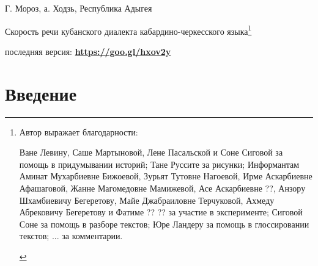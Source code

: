 
\usepackage{alltt}

\begin{flushright}
	{\footnotesize Г. Мороз, а. Ходзь, Республика Адыгея}
\end{flushright}
\begin{center}{\Large Скорость речи кубанского диалекта кабардино-черкесского языка\footnote{Автор выражает благодарности:
\begin{itemize}
\mytem Ване Левину, Саше Мартыновой, Лене Пасальской и Соне Сиговой за помощь в придумывании историй;
\mytem Тане Руссите за рисунки;
\mytem Информантам Аминат Мухарбиевне Бижоевой, Зурьят Тутовне Нагоевой, Ирме Аскарбиевне Афашаговой, Жанне Магомедовне Мамижевой, Асе Аскарбиевне ??, Анзору Шхамбиевичу Бегеретову, Майе Джабраиловне Терчуковой,  Ахмеду Абрековичу Бегеретову и Фатиме ?? ?? за участие в эксперименте;
\mytem Сиговой Соне за помощь в разборе текстов;
\mytem Юре Ландеру за помощь в глоссировании текстов;
\mytem ... за комментарии.
\end{itemize}}}
\end{center}
{\noindent\footnotesize последняя версия: \textbf{\href{https://goo.gl/hxov2y}{https://goo.gl/hxov2y}}}
\tableofcontents
\vfill
\pagebreak
\section{Введение}

